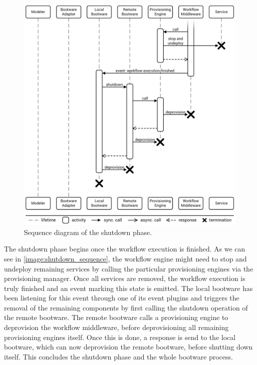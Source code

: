 \begin{figure}[!htbp]
	\centering
	\includegraphics[resolution=600]{process/assets/shutdown_sequence}
	\caption{Sequence diagram of the shutdown phase.}
	\label{image:shutdown_sequence}
\end{figure}

The shutdown phase begins once the workflow execution is finished.
As we can see in \autoref{image:shutdown_sequence}, the workflow engine might need to stop and undeploy remaining services by calling the particular provisioning engines via the provisioning manager.
Once all services are removed, the workflow execution is truly finished and an event marking this state is emitted.
The local bootware has been listening for this event through one of its event plugins and triggers the removal of the remaining components by first calling the shutdown operation of the remote bootware.
The remote bootware calls a provisioning engine to deprovision the workflow middleware, before deprovisioning all remaining provisioning engines itself.
Once this is done, a response is send to the local bootware, which can now deprovision the remote bootware, before shutting down itself.
This concludes the shutdown phase and the whole bootware process.
